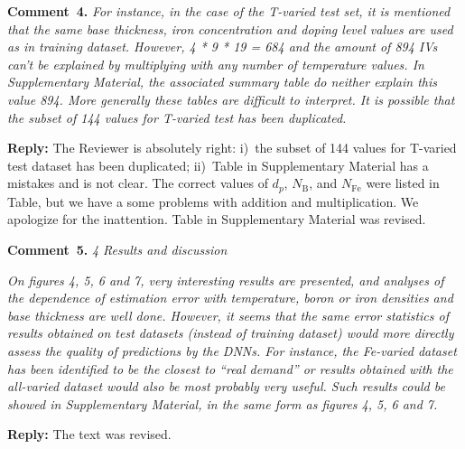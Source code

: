 \documentclass[num-refs]{wiley-article} %
\begin{document}
\vspace{1cm}
\noindent
\textcolor[rgb]{0.00,0.50,1.00}{\textbf{Comment~4.}}
\emph{
For instance, in the case of the T-varied test set, it is mentioned that the same base thickness,
iron concentration and doping level values are used as in training dataset.
However, 4 * 9 * 19 = 684 and the amount of 894 IVs can’t be explained by multiplying with any number of temperature values.
In Supplementary Material, the associated summary table do neither explain this value 894. More generally these tables are difficult to interpret. It is possible that the subset of 144 values for T-varied test has been duplicated. }

\vspace{0.5cm}
\noindent
\textcolor[rgb]{0.51,0.00,0.00}{\textbf{Reply:}}
The Reviewer is absolutely right:
i)~the subset of 144 values for T-varied test dataset has been duplicated;
ii)~Table in Supplementary Material has a mistakes and is not clear.
The correct values of $d_p$, $N_\mathrm{B}$, and $N_{\mathrm{Fe}}$ were listed in Table,
but we have a some problems with addition and multiplication.
We apologize for the inattention.
Table in Supplementary Material was revised.

\vspace{1cm}
\noindent
\textcolor[rgb]{0.00,0.50,1.00}{\textbf{Comment~5.}}
\emph{4 Results and discussion}

\emph{
On figures 4, 5, 6 and 7, very interesting results are presented, and analyses of the dependence of estimation
error with temperature, boron or iron densities and base thickness are well done.
However, it seems that the same error statistics of results obtained on test datasets
(instead of training dataset) would more directly assess the quality of predictions by the DNNs.
For instance, the Fe-varied dataset has been identified to be
the closest to “real demand” or results obtained with the all-varied dataset would also be most probably very useful.
Such results could be showed in Supplementary Material, in the same form as figures 4, 5, 6 and 7. }

\vspace{0.5cm}
\noindent
\textcolor[rgb]{0.51,0.00,0.00}{\textbf{Reply:}}
The text was revised.
\end{document}
